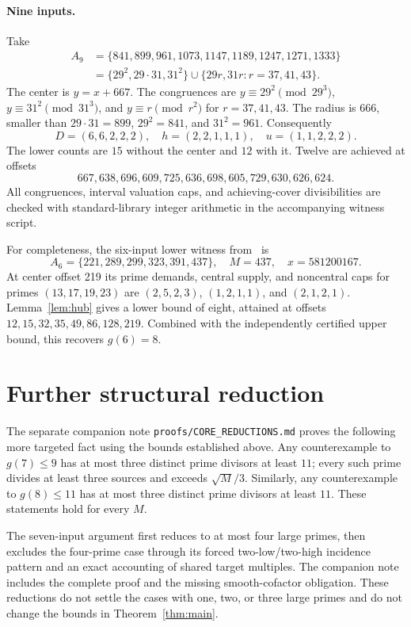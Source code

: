 \documentclass[11pt,a4paper]{article}
\begin{document}
\paragraph{Nine inputs.}
Take
\begin{align*}
 A_9&=\{841,899,961,1073,1147,1189,1247,1271,1333\}\\
 &=\{29^2,29\cdot31,31^2\}\cup\{29r,31r:r=37,41,43\}.
\end{align*}
The center is $y=x+667$. The congruences are $y\equiv29^2\pmod{29^3}$, $y\equiv31^2\pmod{31^3}$, and $y\equiv r\pmod{r^2}$ for $r=37,41,43$. The radius is 666, smaller than $29\cdot31=899$, $29^2=841$, and $31^2=961$. Consequently
\[
 D=(6,6,2,2,2),\quad h=(2,2,1,1,1),\quad u=(1,1,2,2,2).
\]
The lower counts are $15$ without the center and $12$ with it. Twelve are achieved at offsets
\[
 667,638,696,609,725,636,698,605,729,630,626,624.
\]
All congruences, interval valuation caps, and achieving-cover divisibilities are checked with standard-library integer arithmetic in the accompanying witness script.

For completeness, the six-input lower witness from~\cite{bergstrom} is
\[
 A_6=\{221,289,299,323,391,437\},\quad M=437,\quad x=581200167.
\]
At center offset 219 its prime demands, central supply, and noncentral caps for primes $(13,17,19,23)$ are $(2,5,2,3)$, $(1,2,1,1)$, and $(2,1,2,1)$. Lemma~\ref{lem:hub} gives a lower bound of eight, attained at offsets $12,15,32,35,49,86,128,219$. Combined with the independently certified upper bound, this recovers $g(6)=8$.

\section{Further structural reduction}
The separate companion note \texttt{proofs/CORE\_REDUCTIONS.md} proves the following more targeted fact using the bounds established above. Any counterexample to $g(7)\le9$ has at most three distinct prime divisors at least $11$; every such prime divides at least three sources and exceeds $\sqrt{M}/3$. Similarly, any counterexample to $g(8)\le11$ has at most three distinct prime divisors at least $11$. These statements hold for every $M$.

The seven-input argument first reduces to at most four large primes, then excludes the four-prime case through its forced two-low/two-high incidence pattern and an exact accounting of shared target multiples. The companion note includes the complete proof and the missing smooth-cofactor obligation. These reductions do not settle the cases with one, two, or three large primes and do not change the bounds in Theorem~\ref{thm:main}.
\end{document}

